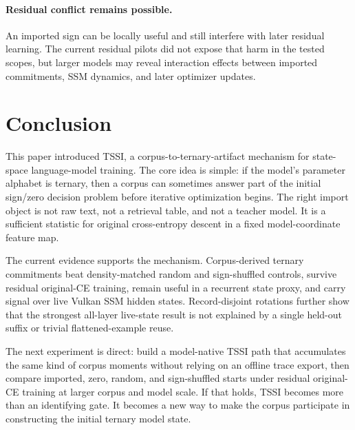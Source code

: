 \documentclass{article}
\begin{document}
\paragraph{Residual conflict remains possible.}
An imported sign can be locally useful and still interfere with later residual
learning. The current residual pilots did not expose that harm in the tested
scopes, but larger models may reveal interaction effects between imported
commitments, SSM dynamics, and later optimizer updates.

\section{Conclusion}

This paper introduced TSSI, a corpus-to-ternary-artifact mechanism for
state-space language-model training. The core idea is simple: if the model's
parameter alphabet is ternary, then a corpus can sometimes answer part of the
initial sign/zero decision problem before iterative optimization begins. The
right import object is not raw text, not a retrieval table, and not a teacher
model. It is a sufficient statistic for original cross-entropy descent in a
fixed model-coordinate feature map.

The current evidence supports the mechanism. Corpus-derived ternary
commitments beat density-matched random and sign-shuffled controls, survive
residual original-CE training, remain useful in a recurrent state proxy, and
carry signal over live Vulkan SSM hidden states. Record-disjoint rotations
further show that the strongest all-layer live-state result is not explained by
a single held-out suffix or trivial flattened-example reuse.

The next experiment is direct: build a model-native TSSI path that accumulates
the same kind of corpus moments without relying on an offline trace export,
then compare imported, zero, random, and sign-shuffled starts under residual
original-CE training at larger corpus and model scale. If that holds, TSSI
becomes more than an identifying gate. It becomes a new way to make the corpus
participate in constructing the initial ternary model state.



\end{document}
